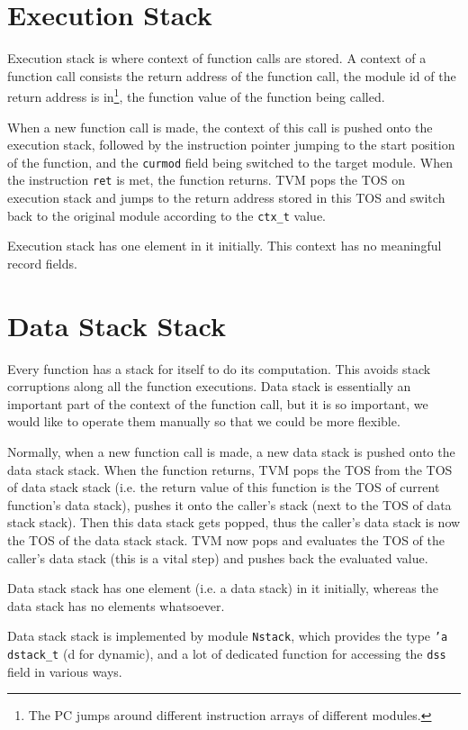 \documentclass{report}
\begin{document}
\section{Execution Stack}

Execution stack is where context of function calls are stored. A context of a function call consists the return address of the function call, the module id of the return address is in\footnote{The PC jumps around different instruction arrays of different modules.}, the function value of the function being called.

When a new function call is made, the context of this call is pushed onto the execution stack, followed by the instruction pointer jumping to the start position of the function, and the \texttt{curmod} field being switched to the target module. When the instruction \texttt{ret} is met, the function returns. TVM pops the TOS on execution stack and jumps to the return address stored in this TOS and switch back to the original module according to the \texttt{ctx\_t} value.

\begin{mdframed}[style=detail]
  Execution stack has one element in it initially. This context has no
  meaningful record fields.
\end{mdframed}

\section{Data Stack Stack}

Every function has a stack for itself to do its computation. This avoids stack corruptions along all the function executions. Data stack is essentially an important part of the context of the function call, but it is so important, we would like to operate them manually so that we could be more flexible.

Normally, when a new function call is made, a new data stack is pushed onto the data stack stack. When the function returns, TVM pops the TOS from the TOS of data stack stack (i.e. the return value of this function is the TOS of current function's data stack), pushes it onto the caller's stack (next to the TOS of data stack stack). Then this data stack gets popped, thus the caller's data stack is now the TOS of the data stack stack. TVM now pops and evaluates the TOS of the caller's data stack (this is a vital step) and pushes back the evaluated value.

\begin{mdframed}[style=detail]
  Data stack stack has one element (i.e. a data stack) in it
  initially, whereas the data stack has no elements whatsoever.

  Data stack stack is implemented by module \texttt{Nstack}, which
  provides the type \texttt{'a dstack\_t} (d for dynamic), and a lot
  of dedicated function for accessing the \texttt{dss} field in
  various ways.
\end{mdframed}
\end{document}
